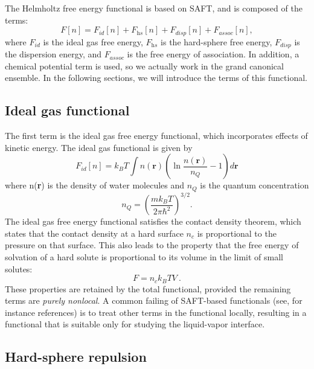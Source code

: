 \documentclass[letterpaper,twocolumn,amsmath,amssymb,prb]{revtex4-1}
\newcommand{\xx}{\textbf{r}}
\begin{document}
The Helmholtz free energy functional is based on SAFT,
and is composed of the terms:
\begin{equation}
  F[n] = F_\textit{id}[n] + F_\textit{hs}[n]  +
F_\textit{disp}[n]+ F_\textit{assoc}[n],
\end{equation}
where $F_\textit{id}$ is the ideal gas free energy, $F_\textit{hs}$ is
the hard-sphere free energy, $F_\textit{disp}$ is the dispersion energy,
and $F_\textit{assoc}$ is the free energy of association.  In
addition, a chemical potential term is used, so we actually work in
the grand canonical ensemble.  In the following sections, we will
introduce the terms of this functional.

\subsection{Ideal gas functional}
The first term is the ideal gas free energy functional, which
incorporates effects of kinetic energy.  The ideal gas functional is
given by
\begin{equation}\label{idealgas}
  F_{id}[n] = k_B T \int n(\xx)\left( \ln{\frac{n(\xx)}{n_Q}} - 1\right) d\xx
\end{equation}
where n(\xx) is the density of water molecules and $n_Q$ is the
quantum concentration
\begin{equation}\label{quantumconcentration}
 n_Q =\left(\frac{mk_BT}{2\pi\hbar^2}\right)^{3/2}.
\end{equation}
The ideal gas free energy functional satisfies the contact density
theorem, which states that the contact density at a hard surface $n_c$
is proportional to the pressure on that surface. This
also leads to the property that the free energy of solvation of
a hard solute is proportional to its volume in the limit of small
solutes: 
\begin{equation}\label{contactvaluethm}
  F = n_c k_BT V\:.
\end{equation}
These properties are retained by the total functional,
provided the remaining terms are \emph{purely nonlocal}.  A common
failing of SAFT-based functionals (see, for instance
references\cite{felipe2001examination, gloor2002saft,
  gloor2004accurate, clark2006developing, gloor2007prediction,
  kahl2008modified, gross2009density}) is to treat other terms in the
functional locally, resulting in a functional that is suitable only
for studying the liquid-vapor interface.


\subsection{Hard-sphere repulsion}
\end{document}
